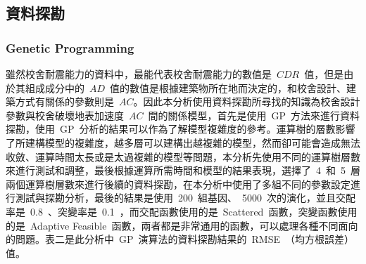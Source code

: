 \subsection{資料探勘}

\subsubsection{Genetic Programming}

雖然校舍耐震能力的資料中，最能代表校舍耐震能力的數值是~$CDR$~值，但是由於其組成成分中的~$AD$~值的數值是根據建築物所在地而決定的，和校舍設計、建築方式有關係的參數則是~$AC$。因此本分析使用資料探勘所尋找的知識為校舍設計參數與校舍破壞地表加速度~$AC$~間的關係模型，首先是使用~GP~方法來進行資料探勘，使用~GP~分析的結果可以作為了解模型複雜度的參考。運算樹的層數影響了所建構模型的複雜度，越多層可以建構出越複雜的模型，然而卻可能會造成無法收斂、運算時間太長或是太過複雜的模型等問題，本分析先使用不同的運算樹層數來進行測試和調整，最後根據運算所需時間和模型的結果表現，選擇了~4~和~5~層兩個運算樹層數來進行後續的資料探勘，在本分析中使用了多組不同的參數設定進行測試與探勘分析，最後的結果是使用~200~組基因、~5000~次的演化，並且交配率是~0.8~、突變率是~0.1~，而交配函數使用的是~Scattered~函數，突變函數使用的是~Adaptive Feasible~函數，兩者都是非常通用的函數，可以處理各種不同面向的問題。表二是此分析中~GP~演算法的資料探勘結果的~RMSE~（均方根誤差）值。


